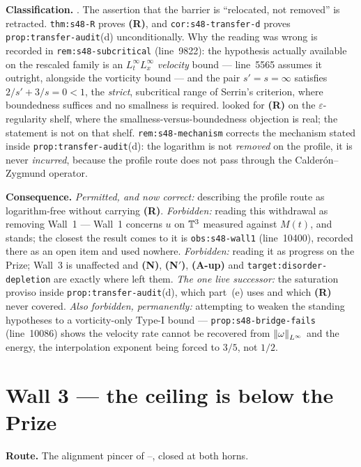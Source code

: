 \textbf{Classification.} \WITHDRAWN{}. The assertion that the barrier is
``relocated, not removed'' is retracted. \texttt{thm:s48-R} proves
\textbf{(R)}, and \texttt{cor:s48-transfer-d} proves
\texttt{prop:transfer-audit}(d) unconditionally. Why the  reading was
wrong is recorded in \texttt{rem:s48-subcritical} (line~9822): the hypothesis
actually available on the rescaled family is an \(L^\infty_tL^\infty_x\)
\emph{velocity} bound --- line~5565 assumes it outright, alongside the
vorticity bound --- and the pair \(s'=s=\infty\) satisfies \(2/s'+3/s=0<1\),
the \emph{strict}, subcritical range of Serrin's criterion, where boundedness
suffices and no smallness is required.  looked for \textbf{(R)} on the
\(\varepsilon\)-regularity shelf, where the smallness-versus-boundedness
objection is real; the statement is not on that shelf.
\texttt{rem:s48-mechanism} corrects the mechanism stated inside
\texttt{prop:transfer-audit}(d): the logarithm is not \emph{removed} on the
profile, it is never \emph{incurred}, because the profile route does not pass
through the Calder\'on--Zygmund operator.

\textbf{Consequence.} \emph{Permitted, and now correct:} describing the profile
route as logarithm-free without carrying \textbf{(R)}. \emph{Forbidden:}
reading this withdrawal as removing Wall~1 --- Wall~1 concerns \(u\) on
\(\mathbb{T}^3\) measured against \(M(t)\), and stands; the closest the result comes to
it is \texttt{obs:s48-wall1} (line~10400), recorded there as an open item and
used nowhere. \emph{Forbidden:} reading it as progress on the Prize; Wall~3 is
unaffected and \textbf{(N)}, \textbf{(N\('\))}, \textbf{(A-up)} and
\texttt{target:disorder-depletion} are exactly where  left them.
\emph{The one live successor:} the saturation proviso inside
\texttt{prop:transfer-audit}(d), which part~(e) uses and which \textbf{(R)}
never covered. \emph{Also forbidden, permanently:} attempting to weaken the
standing hypotheses to a vorticity-only Type-I bound ---
\texttt{prop:s48-bridge-fails} (line~10086) shows the velocity rate cannot be
recovered from \(\left\|\omega\right\|_{L^\infty}\) and the energy, the interpolation
exponent being forced to \(3/5\), not \(1/2\).

\section{Wall 3 --- the ceiling is below the Prize}
\label{sec:wall3}

\textbf{Route.} The alignment pincer of --, closed at both horns.

